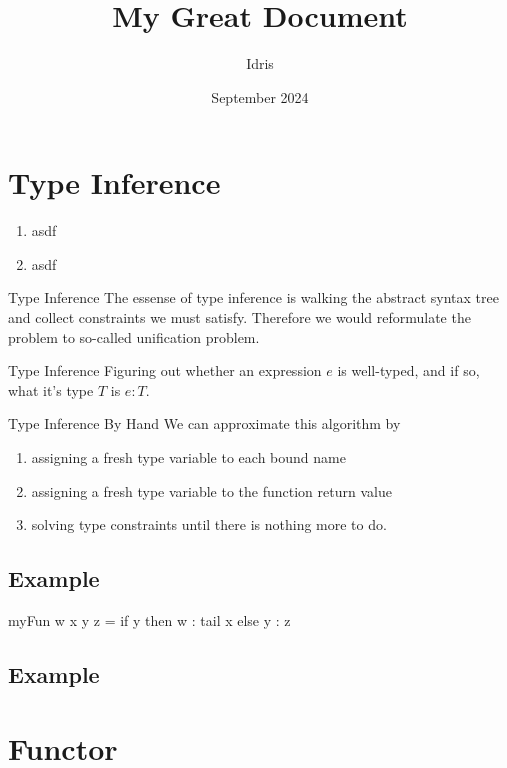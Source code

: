 \documentclass[openany, 12pt]{book}
\title{My Great Document}
\author{Idris}
\date{September 2024}
\begin{document}
\maketitle{}
\tableofcontents

\listoffigures
\listoftables

\chapter{Type Inference}

\begin{enumerate}[label = {(\alph*)}]
	\item asdf
	\item asdf
\end{enumerate}

\begin{intuition}{Type Inference}
	The essense of type inference is walking the abstract syntax tree and
	collect constraints we must satisfy. Therefore we would reformulate the
	problem to so-called unification problem.
\end{intuition}

\begin{definition}{Type Inference}{}
	Figuring out whether an expression $e$ is well-typed, and if so, what it's
	type $T$ is $e: T$.
\end{definition}

\begin{definition}{Type Inference By Hand}{}
	We can approximate this algorithm by
	\begin{enumerate}
		\item assigning a fresh type variable to each bound name
		\item assigning a fresh type variable to the function return value
		\item solving type constraints until there is nothing more to do.
	\end{enumerate}
\end{definition}

\section{Example}
\begin{haskell}{}
	myFun w x y z = if y then w : tail x else y : z
\end{haskell}

\section{Example}

\chapter{Functor}

\clearpage
\printglossaries

\printindex{}
\end{document}
